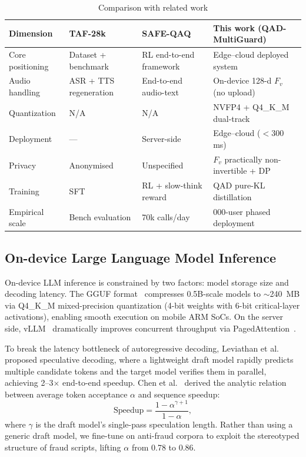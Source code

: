 \documentclass[11pt, a4paper]{article}
\begin{document}
\begin{table}[htbp]
\centering\small
\caption{Comparison with related work}
\label{tab1}
\renewcommand{\arraystretch}{1.15}
\setlength{\tabcolsep}{6pt}
\begin{tabular}{>{\centering\arraybackslash}m{2.2cm}>{\raggedright\arraybackslash}m{3.5cm}>{\raggedright\arraybackslash}m{3.5cm}>{\raggedright\arraybackslash}m{5cm}}
\toprule
\textbf{Dimension} & \textbf{TAF-28k~\cite{1}} & \textbf{SAFE-QAQ~\cite{2}} & \textbf{This work (QAD-MultiGuard)} \\
\midrule
Core positioning & Dataset + benchmark & RL end-to-end framework & Edge--cloud deployed system \\
Audio handling & ASR + TTS regeneration & End-to-end audio-text & On-device 128-d $F_v$ (no upload) \\
Quantization & N/A & N/A & NVFP4 + Q4\_K\_M dual-track \\
Deployment & --- & Server-side & Edge--cloud ($<$300 ms) \\
Privacy & Anonymised & Unspecified & $F_v$ practically non-invertible + DP \\
Training & SFT & RL + slow-think reward & QAD pure-KL distillation \\
Empirical scale & Bench evaluation & 70k calls/day & 5{,}000-user phased deployment \\
\bottomrule
\end{tabular}
\end{table}

\subsection{On-device Large Language Model Inference}

On-device LLM inference is constrained by two factors: model storage size and decoding latency. The GGUF format~\cite{17} compresses 0.5B-scale models to $\sim$240~MB via Q4\_K\_M mixed-precision quantization (4-bit weights with 6-bit critical-layer activations), enabling smooth execution on mobile ARM SoCs. On the server side, vLLM~\cite{18} dramatically improves concurrent throughput via PagedAttention~\cite{19}.

To break the latency bottleneck of autoregressive decoding, Leviathan et al.~\cite{20} proposed speculative decoding, where a lightweight draft model rapidly predicts multiple candidate tokens and the target model verifies them in parallel, achieving 2--3$\times$ end-to-end speedup. Chen et al.~\cite{21} derived the analytic relation between average token acceptance $\alpha$ and sequence speedup:
\begin{equation}
\text{Speedup} = \frac{1-\alpha^{\gamma+1}}{1-\alpha},
\end{equation}
where $\gamma$ is the draft model's single-pass speculation length. Rather than using a generic draft model, we fine-tune on anti-fraud corpora to exploit the stereotyped structure of fraud scripts, lifting $\alpha$ from 0.78 to 0.86.
\end{document}
